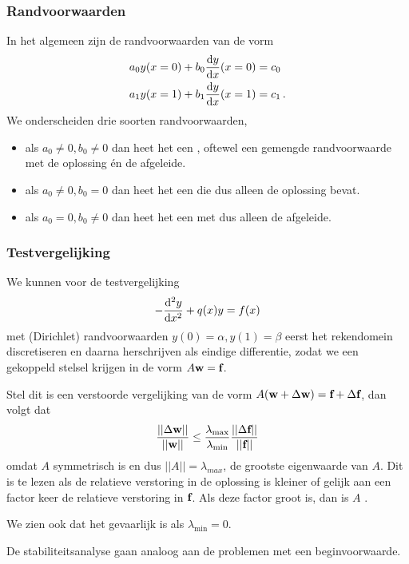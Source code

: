 \documentclass{2wn20summary}
\begin{document}
		 \subsubsection{Randvoorwaarden}
		 In het algemeen zijn de randvoorwaarden van de vorm
		 \begin{align*}
			 a_0 y(x=0) + b_0 \frac{\mathop{}\!\mathrm{d} y}{\mathop{}\!\mathrm{d} x} (x=0) &= c_0 \\
			 a_1 y(x=1) + b_1 \frac{\mathop{}\!\mathrm{d} y}{\mathop{}\!\mathrm{d} x} (x=1) &= c_1 \,.
		 \end{align*}
		 We onderscheiden drie soorten randvoorwaarden,
		 \begin{itemize}
		 	\item als $a_0 \neq 0, b_0 \neq 0$ dan heet het een , oftewel een gemengde randvoorwaarde met de oplossing \'en de afgeleide.
		 	\item als $a_0 \neq 0, b_0 = 0$ dan heet het een  die dus alleen de oplossing bevat.
		 	\item als $a_0 =0, b_0 \neq 0$ dan heet het een  met dus alleen de afgeleide.
		 \end{itemize}
		 
		 \subsubsection{Testvergelijking}
		 We kunnen voor de testvergelijking 
		 \[ 
			 - \frac{\mathop{}\!\mathrm{d}^2 y}{\mathop{}\!\mathrm{d} x^2} + q(x) y = f(x)
		  \]
		  met (Dirichlet) randvoorwaarden $y(0) = \alpha, y(1) =\beta$
		  eerst het rekendomein discretiseren en daarna herschrijven als eindige differentie, zodat we een gekoppeld stelsel krijgen in de vorm $A {\textbf{w}} = {\textbf{f}}$. 
		  
		  Stel dit is een verstoorde vergelijking van de vorm $A ({\textbf{w}} + \Delta {\textbf{w}} ) = {\textbf{f}} + \Delta {\textbf{f}} $, dan volgt dat
		  \[ 
			  \frac{|| \Delta {\textbf{w}} ||}{||{\textbf{w}} ||} \le \frac{\lambda_{\max}}{\lambda_{\min}} \frac{|| \Delta {\textbf{f}} ||}{|| {\textbf{f}} ||}
		   \] 
		   omdat $A$ symmetrisch is en dus $||A|| =\lambda_{max}$, de grootste eigenwaarde van $A$. Dit is te lezen als de relatieve verstoring in de oplossing is kleiner of gelijk aan een factor keer de relatieve verstoring in ${\textbf{f}} $. Als deze factor groot is, dan is $A$ .
		   
		   We zien ook dat het gevaarlijk is als $\lambda_{\min}=0$.
		   
		   De stabiliteitsanalyse gaan analoog aan de problemen met een beginvoorwaarde.
		   
\end{document}
